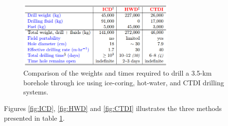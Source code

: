 \begin{figure}[htb]
  \centering
  \includegraphics[width=0.7\textwidth]{figures/mlh/table_ice_core_drilling}
  \caption{Comparison of the weights and times required to drill a 3.5-km borehole through ice using ice-coring, hot-water, and CTDI drilling systems.}
  \label{tab:ice_core_drilling}
\end{figure}

Figures \ref{fig:ICD}, \ref{fig:HWD} and \ref{fig:CTDI} illustrates the three methods presented in table \ref{tab:ice_core_drilling}.

